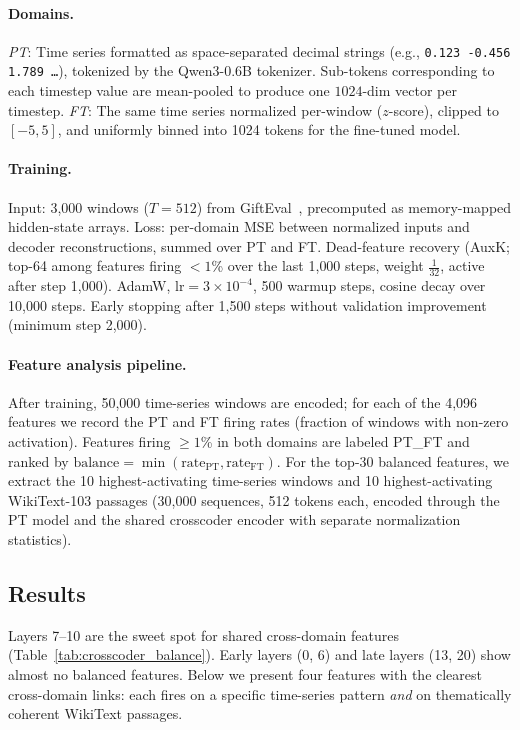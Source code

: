 \documentclass{article}
\begin{document}
\paragraph{Domains.}
\emph{PT}: Time series formatted as space-separated decimal strings (e.g., \texttt{0.123 -0.456 1.789\,\ldots}), tokenized by the Qwen3-0.6B tokenizer.  Sub-tokens corresponding to each timestep value are mean-pooled to produce one $1024$-dim vector per timestep.
\emph{FT}: The same time series normalized per-window ($z$-score), clipped to $[-5,5]$, and uniformly binned into 1024 tokens for the fine-tuned model.

\paragraph{Training.}
Input: 3{,}000 windows ($T{=}512$) from GiftEval~\citep{aksu2024giftevalgeneralizedinstructionfollowing}, precomputed as memory-mapped hidden-state arrays.  Loss: per-domain MSE between normalized inputs and decoder reconstructions, summed over PT and FT.  Dead-feature recovery (AuxK; top-64 among features firing ${<}1$\% over the last 1{,}000 steps, weight $\frac{1}{32}$, active after step 1{,}000).  AdamW, $\mathrm{lr}{=}3{\times}10^{-4}$, 500 warmup steps, cosine decay over 10{,}000 steps.  Early stopping after 1{,}500 steps without validation improvement (minimum step 2{,}000).

\paragraph{Feature analysis pipeline.}
After training, 50{,}000 time-series windows are encoded; for each of the 4{,}096 features we record the PT and FT firing rates (fraction of windows with non-zero activation).  Features firing ${\geq}1$\% in both domains are labeled \textsc{PT\_FT} and ranked by $\text{balance} = \min(\text{rate}_{\mathrm{PT}}, \text{rate}_{\mathrm{FT}})$.  For the top-30 balanced features, we extract the 10 highest-activating time-series windows and 10 highest-activating WikiText-103 passages (30{,}000 sequences, 512 tokens each, encoded through the PT model and the shared crosscoder encoder with separate normalization statistics).

\subsection{Results}
\label{app:crosscoder_results}

Layers 7--10 are the sweet spot for shared cross-domain features (Table~\ref{tab:crosscoder_balance}).  Early layers (0, 6) and late layers (13, 20) show almost no balanced features.  Below we present four features with the clearest cross-domain links: each fires on a specific time-series pattern \emph{and} on thematically coherent WikiText passages.
\end{document}
